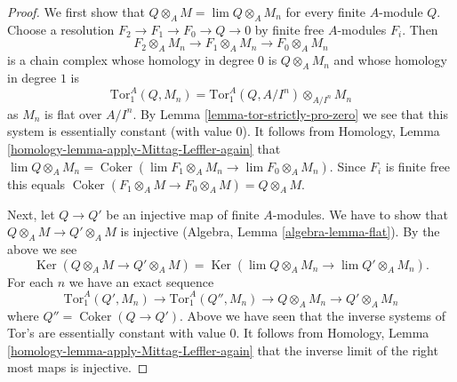 \documentclass[10pt,a4paper]{amsart}
\theoremstyle{plain}
\theoremstyle{definition}
\theoremstyle{remark}
\numberwithin{equation}{subsection}
\def\lim{\mathop{\mathrm{lim}}\nolimits}
\def\Ker{\mathop{\mathrm{Ker}}}
\def\Coker{\mathop{\mathrm{Coker}}}
\begin{document}
\begin{proof}
We first show that $Q \otimes_A M = \lim Q \otimes_A M_n$ for every finite
$A$-module $Q$. Choose a resolution $F_2 \to F_1 \to F_0 \to Q \to 0$
by finite free $A$-modules $F_i$. Then
$$
F_2 \otimes_A M_n \to F_1 \otimes_A M_n \to F_0 \otimes_A M_n
$$
is a chain complex whose homology in degree $0$ is $Q \otimes_A M_n$
and whose homology in degree $1$ is
$$
\text{Tor}_1^A(Q, M_n) = \text{Tor}_1^A(Q, A/I^n) \otimes_{A/I^n} M_n
$$
as $M_n$ is flat over $A/I^n$. By Lemma \ref{lemma-tor-strictly-pro-zero}
we see that this system is essentially constant (with value $0$).
It follows from Homology, Lemma \ref{homology-lemma-apply-Mittag-Leffler-again}
that $\lim Q \otimes_A M_n =
\Coker(\lim F_1 \otimes_A M_n \to \lim F_0 \otimes_A M_n)$.
Since $F_i$ is finite free this equals
$\Coker(F_1 \otimes_A M \to F_0 \otimes_A M) = Q \otimes_A M$.

\medskip\noindent
Next, let $Q \to Q'$ be an injective map of finite $A$-modules.
We have to show that $Q \otimes_A M \to Q' \otimes_A M$ is injective
(Algebra, Lemma \ref{algebra-lemma-flat}). By the above we see
$$
\Ker(Q \otimes_A M \to Q' \otimes_A M) =
\Ker(\lim Q \otimes_A M_n \to \lim Q' \otimes_A M_n).
$$
For each $n$ we have an exact sequence
$$
\text{Tor}_1^A(Q', M_n) \to \text{Tor}_1^A(Q'', M_n) \to
Q \otimes_A M_n \to Q' \otimes_A M_n
$$
where $Q'' = \Coker(Q \to Q')$. Above we have seen that the
inverse systems of Tor's are essentially constant with value $0$.
It follows from
Homology, Lemma \ref{homology-lemma-apply-Mittag-Leffler-again}
that the inverse limit of the right most maps is injective.
\end{proof}
\end{document}
